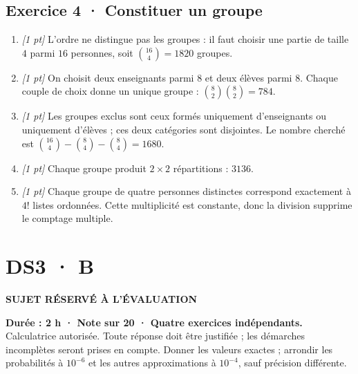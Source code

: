 \subsection*{Exercice 4 · Constituer un groupe}\begin{enumerate}

\item \textit{[1 pt]} L'ordre ne distingue pas les groupes : il faut choisir une partie de taille $4$ parmi $16$ personnes, soit $\binom{16}4=1820$ groupes.

\item \textit{[1 pt]} On choisit deux enseignants parmi $8$ et deux élèves parmi $8$. Chaque couple de choix donne un unique groupe : $\binom{8}2\binom{8}2=784$.

\item \textit{[1 pt]} Les groupes exclus sont ceux formés uniquement d'enseignants ou uniquement d'élèves ; ces deux catégories sont disjointes. Le nombre cherché est $\binom{16}4-\binom{8}4-\binom{8}4=1680$.

\item \textit{[1 pt]} Chaque groupe produit $2\times2$ répartitions : $3136$.

\item \textit{[1 pt]} Chaque groupe de quatre personnes distinctes correspond exactement à $4!$ listes ordonnées. Cette multiplicité est constante, donc la division supprime le comptage multiple.

\end{enumerate}

\fi

\fi

\ifprof

\clearpage{}\label{sujet:4-4}

\section*{DS3 · B}

{\sffamily\bfseries\color{amber}SUJET RÉSERVÉ À L'ÉVALUATION\par}

\textbf{Durée : 2 h · Note sur 20 · Quatre exercices indépendants.}\\Calculatrice autorisée. Toute réponse doit être justifiée ; les démarches incomplètes seront prises en compte. Donner les valeurs exactes ; arrondir les probabilités à $10^{-6}$ et les autres approximations à $10^{-4}$, sauf précision différente.

